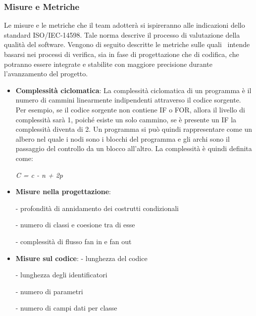 \subsubsection{Misure e Metriche}
Le misure e le metriche che il team adotterà si ispireranno alle indicazioni dello standard ISO/IEC-14598. Tale norma descrive il processo di valutazione della qualità del software. Vengono di seguito descritte le metriche sulle quali \gruppo\ intende basarsi nei processi di verifica, sia in fase di progettazione che di codifica, che potranno essere integrate e stabilite con maggiore precisione durante l'avanzamento del progetto.
\begin{itemize}
    \item \textbf{Complessità ciclomatica}:
    La complessità ciclomatica di un programma è il
    numero di cammini linearmente indipendenti attraverso il codice sorgente. Per esempio, se il codice sorgente non contiene IF o FOR, allora il livello di complessità sarà 1, poiché esiste un solo 
    cammino, se è presente un IF la complessità diventa di 2. Un programma si può quindi rappresentare come un albero nel quale i nodi sono i blocchi del programma e gli archi sono il passaggio del controllo da un blocco all'altro. La complessità è quindi definita come:
    \begin{center}
    	\textit{C = c - n + 2p}
    \end{center}

	\item \textbf{Misure nella progettazione}:
	
	- profondità di annidamento dei costrutti condizionali
	
	- numero di classi e coesione tra di esse
	
	- complessità di flusso fan in e fan out
	
	\item \textbf{Misure sul codice}:
	- lunghezza del codice
	
	- lunghezza degli identificatori
	
	- numero di parametri
	
	- numero di campi dati per classe
	
\end{itemize}